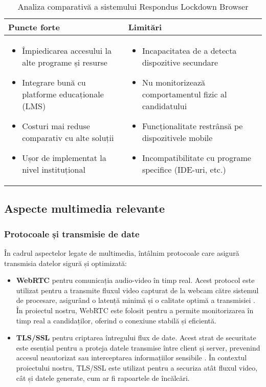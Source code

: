 \documentclass[12pt,a4paper]{article}
\begin{document}
\begin{table}[H] %
    \centering
    \begin{tabular}{|p{8.5cm}|p{8.5cm}|}
    \hline
    \textbf{Puncte forte} & \textbf{Limitări} \\
    \hline
    \begin{itemize}
        \item Împiedicarea accesului la alte programe și resurse
        \item Integrare bună cu platforme educaționale (LMS)
        \item Costuri mai reduse comparativ cu alte soluții
        \item Ușor de implementat la nivel instituțional
    \end{itemize} & 
    \begin{itemize}
        \item Incapacitatea de a detecta dispozitive secundare
        \item Nu monitorizează comportamentul fizic al candidatului
        \item Funcționalitate restrânsă pe dispozitivele mobile
        \item Incompatibilitate cu programe specifice (IDE-uri, etc.)
    \end{itemize} \\
    \hline
    \end{tabular}
    \caption{Analiza comparativă a sistemului Respondus Lockdown Browser}
\end{table}

\subsection{Aspecte multimedia relevante}

\subsubsection{Protocoale și transmisie de date}
În cadrul aspectelor legate de multimedia, întâlnim protocoale care
asigură transmisia datelor sigură și optimizată:
\begin{itemize}
    \item \textbf{WebRTC} pentru comunicația audio-video în timp real. Acest protocol este utilizat pentru a transmite fluxul video capturat de la webcam către sistemul de procesare, asigurând o latență minimă și o calitate optimă a transmisiei \cite{academic1}. În proiectul nostru, WebRTC este folosit pentru a permite monitorizarea în timp real a candidaților, oferind o conexiune stabilă și eficientă.
    \item \textbf{TLS/SSL} pentru criptarea întregului flux de date. Acest strat de securitate este esențial pentru a proteja datele transmise între client și server, prevenind accesul neautorizat sau interceptarea informațiilor sensibile \cite{academic1}. În contextul proiectului nostru, TLS/SSL este utilizat pentru a securiza atât fluxul video, cât și datele generate, cum ar fi rapoartele de încălcări.
\end{itemize}
\end{document}
